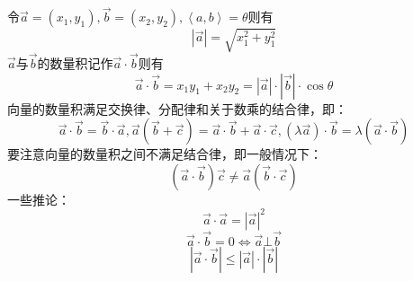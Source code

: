 令$\overrightarrow a  = \left( {{x_1},{y_1}} \right),\overrightarrow b  = \left( {{x_2},{y_2}} \right),\left\langle {a,b} \right\rangle  = \theta $则有
\begin{equation}
\left| {\overrightarrow a } \right| = \sqrt {x_1^2 + y_1^2}
\end{equation}
$\overrightarrow a$与$\overrightarrow b$的数量积记作$\overrightarrow a  \cdot \overrightarrow b $则有
\begin{equation}
\overrightarrow a  \cdot \overrightarrow b  = {x_1}{y_1} + {x_2}{y_2} = \left| {\overrightarrow a } \right| \cdot \left| {\overrightarrow b } \right| \cdot \cos \theta 
\end{equation}
向量的数量积满足交换律、分配律和关于数乘的结合律，即：
\begin{equation}
\overrightarrow a  \cdot \overrightarrow b  = \overrightarrow b  \cdot \overrightarrow a ,\overrightarrow a \left( {\overrightarrow b  + \overrightarrow c } \right) = \overrightarrow a  \cdot \overrightarrow b  + \overrightarrow a  \cdot \overrightarrow c ,\left( {\lambda \overrightarrow a } \right) \cdot \overrightarrow b  = \lambda \left( {\overrightarrow a  \cdot \overrightarrow b } \right)
\end{equation}
要注意向量的数量积之间不满足结合律，即一般情况下：
\begin{equation}
\left( {\overrightarrow a  \cdot \overrightarrow b } \right)\overrightarrow c  \ne \overrightarrow a \left( {\overrightarrow b  \cdot \overrightarrow c } \right)
\end{equation}
一些推论：
\begin{equation}
\overrightarrow a  \cdot \overrightarrow a  = {\left| {\overrightarrow a } \right|^2}
\end{equation}
\begin{equation}
\overrightarrow a  \cdot \overrightarrow b  = 0 \Leftrightarrow \overrightarrow a  \bot \overrightarrow b 
\end{equation}
\begin{equation}
\left| {\overrightarrow a  \cdot \overrightarrow b } \right| \le \left| {\overrightarrow a } \right| \cdot \left| {\overrightarrow b } \right|
\end{equation}